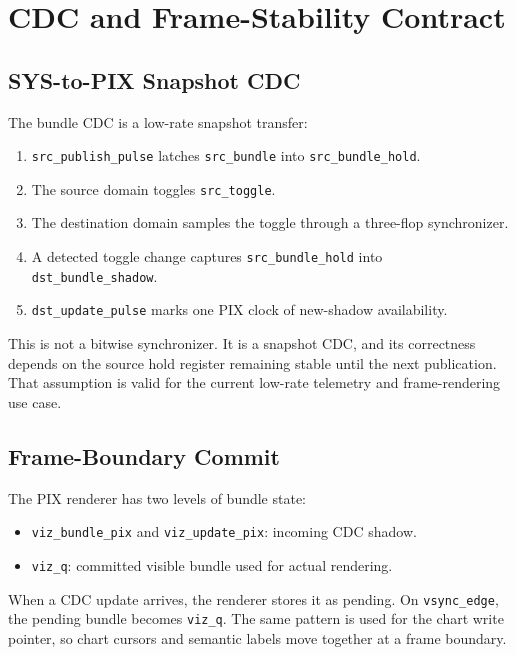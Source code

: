 \documentclass{article}
\newcommand{\sig}[1]{\begingroup\nolinkurl{#1}\endgroup}
\begin{document}
\section{CDC and Frame-Stability Contract}

\subsection{SYS-to-PIX Snapshot CDC}

The bundle CDC is a low-rate snapshot transfer:

\begin{enumerate}
  \item \sig{src_publish_pulse} latches \sig{src_bundle} into
        \sig{src_bundle_hold}.
  \item The source domain toggles \sig{src_toggle}.
  \item The destination domain samples the toggle through a three-flop
        synchronizer.
  \item A detected toggle change captures \sig{src_bundle_hold} into
        \sig{dst_bundle_shadow}.
  \item \sig{dst_update_pulse} marks one PIX clock of new-shadow availability.
\end{enumerate}

This is not a bitwise synchronizer.  It is a snapshot CDC, and its correctness
depends on the source hold register remaining stable until the next publication.
That assumption is valid for the current low-rate telemetry and frame-rendering
use case.

\subsection{Frame-Boundary Commit}

The PIX renderer has two levels of bundle state:

\begin{itemize}
  \item \sig{viz_bundle_pix} and \sig{viz_update_pix}: incoming CDC shadow.
  \item \sig{viz_q}: committed visible bundle used for actual rendering.
\end{itemize}

When a CDC update arrives, the renderer stores it as pending.  On
\sig{vsync_edge}, the pending bundle becomes \sig{viz_q}.  The same pattern is
used for the chart write pointer, so chart cursors and semantic labels move
together at a frame boundary.
\end{document}
